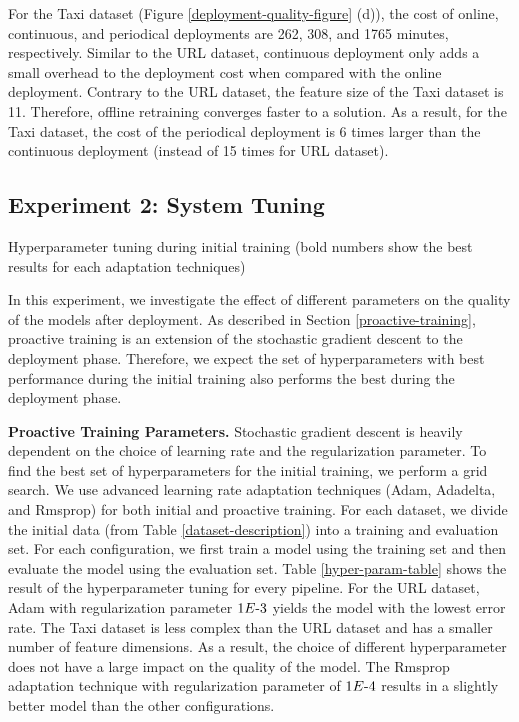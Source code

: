 For the Taxi dataset (Figure \ref{deployment-quality-figure} (d)), the cost of online, continuous, and periodical deployments are 262, 308, and 1765 minutes, respectively.
Similar to the URL dataset, continuous deployment only adds a small overhead to the deployment cost when compared with the online deployment.
Contrary to the URL dataset, the feature size of the Taxi dataset is 11.
Therefore, offline retraining converges faster to a solution.
As a result, for the Taxi dataset, the cost of the periodical deployment is 6 times larger than the continuous deployment (instead of 15 times for URL dataset). 

\subsection{Experiment 2: System Tuning}
\begin{table*}[t]
\centering
\begin{adjustbox}{max width=\textwidth}

\end{adjustbox}
\caption{Hyperparameter tuning during initial training (bold numbers show the best results for each adaptation techniques)}
 \vspace{-20pt}
\label{hyper-param-table}
\end{table*}
In this experiment, we investigate the effect of different parameters on the quality of the models after deployment.
As described in Section \ref{proactive-training}, proactive training is an extension of the stochastic gradient descent to the deployment phase.
Therefore, we expect the set of hyperparameters with best performance during the initial training also performs the best during the deployment phase.

\textbf{Proactive Training Parameters. }
Stochastic gradient descent is heavily dependent on the choice of learning rate and the regularization parameter.
To find the best set of hyperparameters for the initial training, we perform a grid search.
We use advanced learning rate adaptation techniques (Adam, Adadelta, and Rmsprop) for both initial and proactive training.
For each dataset, we divide the initial data (from Table \ref{dataset-description}) into a training and evaluation set.
For each configuration, we first train a model using the training set and then evaluate the model using the evaluation set.
Table \ref{hyper-param-table} shows the result of the hyperparameter tuning for every pipeline.
For the URL dataset, Adam with regularization parameter $1E{\text -}3$ yields the model with the lowest error rate.
The Taxi dataset is less complex than the URL dataset and has a smaller number of feature dimensions.
As a result, the choice of different hyperparameter does not have a large impact on the quality of the model.
The Rmsprop adaptation technique with regularization parameter of $1E{\text -}4$ results in a slightly better model than the other configurations.

